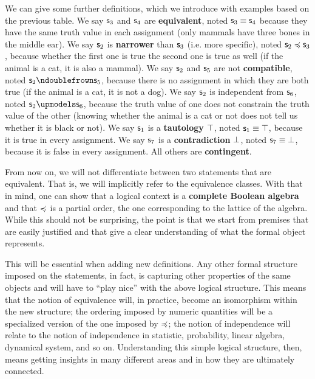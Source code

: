\documentclass[twocolumn]{article}
\begin{document}
We can give some further definitions, which we introduce with examples based on the previous table. We say $\mathsf{s}_3$ and $\mathsf{s}_4$ are \textbf{equivalent}, noted $\mathsf{s}_3 \equiv \mathsf{s}_4$ because they have the same truth value in each assignment (only mammals have three bones in the middle ear). We say $\mathsf{s}_2$ is \textbf{narrower} than $\mathsf{s}_3$ (i.e. more specific), noted $\mathsf{s}_2 \preccurlyeq \mathsf{s}_3$, because whether the first one is true the second one is true as well (if the animal is a cat, it is also a mammal). We say $\mathsf{s}_2$ and $\mathsf{s}_5$ are not \textbf{compatible}, noted $\stmt_2 \ncomp \stmt_5$, because there is no assignment in which they are both true (if the animal is a cat, it is not a dog). We say $\mathsf{s}_2$ is independent from $\mathsf{s}_6$, noted $\stmt_2 \indep \stmt_6$, because the truth value of one does not constrain the truth value of the other (knowing whether the animal is a cat or not does not tell us whether it is black or not). We say $\mathsf{s}_1$ is a \textbf{tautology} $\top$, noted $\mathsf{s}_1 \equiv \top$, because it is true in every assignment. We say $\mathsf{s}_7$ is a \textbf{contradiction} $\bot$, noted $\mathsf{s}_7 \equiv \bot$, because it is false in every assignment. All others are \textbf{contingent}.

From now on, we will not differentiate between two statements that are equivalent. That is, we will implicitly refer to the equivalence classes. With that in mind, one can show that a logical context is a \textbf{complete Boolean algebra} and that $\preccurlyeq$ is a partial order, the one corresponding to the lattice of the algebra. While this should not be surprising, the point is that we start from premises that are easily justified and that give a clear understanding of what the formal object represents.

This will be essential when adding new definitions. Any other formal structure imposed on the statements, in fact, is capturing other properties of the same objects and will have to ``play nice'' with the above logical structure. This means that the notion of equivalence will, in practice, become an isomorphism within the new structure; the ordering imposed by numeric quantities will be a specialized version of the one imposed by $\preccurlyeq$; the notion of independence will relate to the notion of independence in statistic, probability, linear algebra, dynamical system, and so on. Understanding this simple logical structure, then, means getting insights in many different areas and in how they are ultimately connected.
\end{document}
